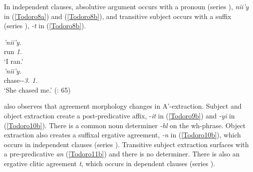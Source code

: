 \documentclass[output=paper]{langscibook}
\begin{document}
In independent clauses, absolutive argument occurs with a pronoun (series {\seriesIII}), \emph{nii’y} in (\ref{Todoro8a}) and (\ref{Todoro8b}), and transitive subject occurs with a suffix (series {\seriesII}), \emph{-t} in (\ref{Todoro8b}).

\begin{exe}
\ex \label{Todoro8}
\begin{xlist}

\ex \label{Todoro8a} 
 {\textit{'nii'y}}.\\
   run \textit{1{\sg}.{\seriesIII}}\\
\glt `I ran.’  \citep[65]{forbes2019a}\\

\ex \label{Todoro8b}
 {\textit{'nii'y}}.\\
    chase-{\tr}-\textit{3.{\seriesII}}  \textit{1{\sg}.{\seriesIII}} \\
\glt `She chased me.’ (\citealt{forbes2019a}: 65) \\

\end{xlist}
\end{exe}

\citet{forbes2019a} also observes that agreement morphology changes in A’-ex\-trac\-tion. Subject and object extraction create a post-predicative affix, -\textit{it} in (\ref{Todoro9b}) and \emph{-yi} in (\ref{Todoro10b}). There is a common noun determiner \emph{-hl} on the wh-phrase. Object extraction also creates a suffixal ergative agreement, \emph{-n} in (\ref{Todoro10b}), which occurs in independent clauses (series {\seriesII}). Transitive subject extraction surfaces with a pre-predicative \textit{an} (\ref{Todoro11b}) and there is no determiner. There is also an ergative clitic agreement \emph{t}, which occurs in dependent clauses (series {\seriesI}). 
\end{document}
